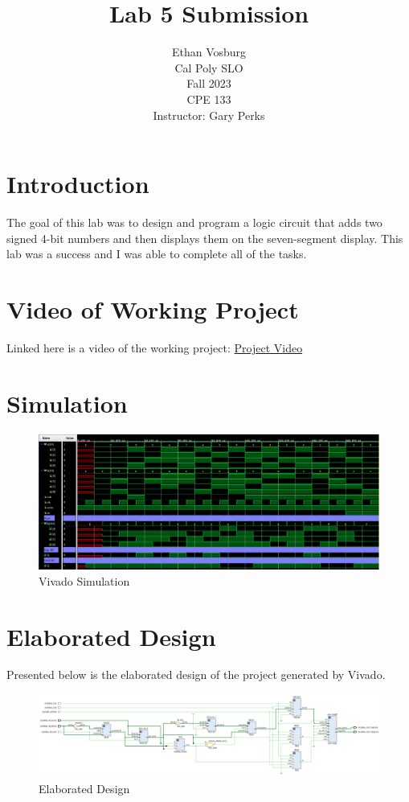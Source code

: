 \documentclass[12pt]{article}
\title{Lab 5 Submission}
\author{Ethan Vosburg\\
    Cal Poly SLO \\
    Fall 2023\\
    CPE 133\\
    Instructor: Gary Perks
}
\begin{document}
\maketitle

\newpage

\section{Introduction}

The goal of this lab was to design and program a logic circuit that adds two signed 4-bit numbers and then displays them on the seven-segment display. This lab was a success and I was able to complete all of the tasks.

\section{Video of Working Project}

Linked here is a video of the working project: \href{https://youtu.be/yPDU-1Xko6k}{Project Video}

\section{Simulation}

\begin{figure}[h]
    \centering
    \includegraphics[width=.8\textwidth]{Figures/CPE 133 Lab 5 Simulation.png}
    \caption{Vivado Simulation}
    \label{fig:simulation}
\end{figure}

\section{Elaborated Design}

Presented below is the elaborated design of the project generated by Vivado.

\begin{figure}[h]
    \centering
    \includegraphics[width=.95\textwidth]{Figures/CPE 133 Lab 5 Elaborated Design.png}
    \caption{Elaborated Design}
    \label{fig:elaborateddesign}
\end{figure}
\end{document}
